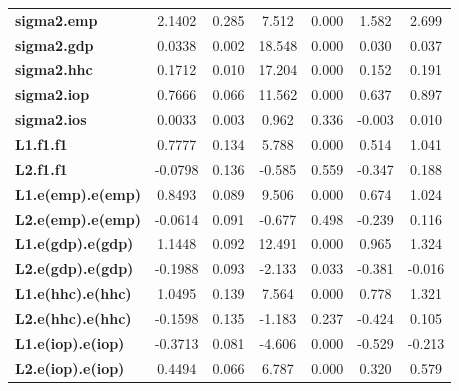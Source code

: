 \begin{center}
\begin{tabular}{lcccccc}
\textbf{sigma2.emp}       &       2.1402  &        0.285     &     7.512  &         0.000        &        1.582    &        2.699     \\
\textbf{sigma2.gdp}       &       0.0338  &        0.002     &    18.548  &         0.000        &        0.030    &        0.037     \\
\textbf{sigma2.hhc}       &       0.1712  &        0.010     &    17.204  &         0.000        &        0.152    &        0.191     \\
\textbf{sigma2.iop}       &       0.7666  &        0.066     &    11.562  &         0.000        &        0.637    &        0.897     \\
\textbf{sigma2.ios}       &       0.0033  &        0.003     &     0.962  &         0.336        &       -0.003    &        0.010     \\
\textbf{L1.f1.f1}         &       0.7777  &        0.134     &     5.788  &         0.000        &        0.514    &        1.041     \\
\textbf{L2.f1.f1}         &      -0.0798  &        0.136     &    -0.585  &         0.559        &       -0.347    &        0.188     \\
\textbf{L1.e(emp).e(emp)} &       0.8493  &        0.089     &     9.506  &         0.000        &        0.674    &        1.024     \\
\textbf{L2.e(emp).e(emp)} &      -0.0614  &        0.091     &    -0.677  &         0.498        &       -0.239    &        0.116     \\
\textbf{L1.e(gdp).e(gdp)} &       1.1448  &        0.092     &    12.491  &         0.000        &        0.965    &        1.324     \\
\textbf{L2.e(gdp).e(gdp)} &      -0.1988  &        0.093     &    -2.133  &         0.033        &       -0.381    &       -0.016     \\
\textbf{L1.e(hhc).e(hhc)} &       1.0495  &        0.139     &     7.564  &         0.000        &        0.778    &        1.321     \\
\textbf{L2.e(hhc).e(hhc)} &      -0.1598  &        0.135     &    -1.183  &         0.237        &       -0.424    &        0.105     \\
\textbf{L1.e(iop).e(iop)} &      -0.3713  &        0.081     &    -4.606  &         0.000        &       -0.529    &       -0.213     \\
\textbf{L2.e(iop).e(iop)} &       0.4494  &        0.066     &     6.787  &         0.000        &        0.320    &        0.579     \\

\end{tabular}
\end{center}
